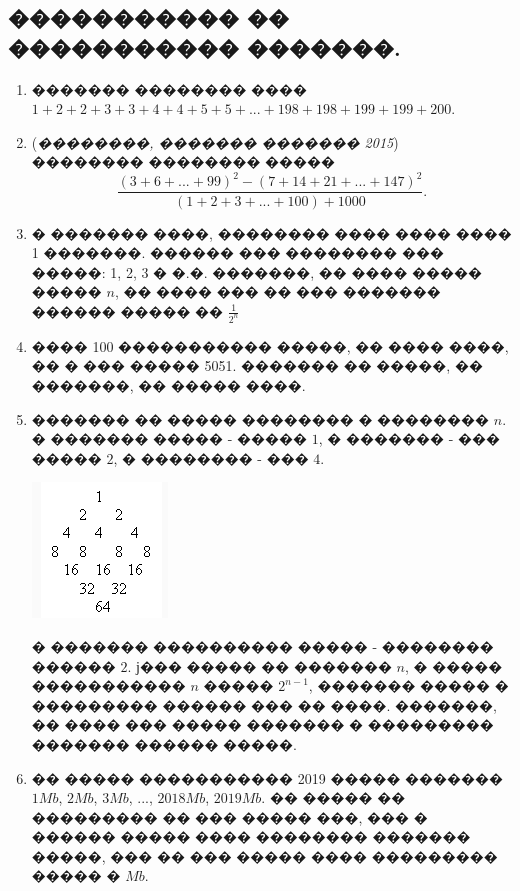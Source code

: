 \documentclass[a4paper,12pt]{article}
\begin{document}
\newpage

\begin{center}
\section*{����������� �� ����������� �������.}
\end{center}

\medskip\medskip\medskip

\begin{enumerate}
\item ������� �������� ���� $1+2+2+3+3+4+4+5+5+...+198+198+199+199+200$.

\item (\textit{��������, ������� ������� 2015})  �������� �������� ����� $$\frac{(3+6+...+99)^{2}-(7+14+21+...+147)^{2}}{(1+2+3+...+100)+1000}.$$

\item � ������� ����, �������� ���� ���� ���� 1 �������. ������ ��� �������� ��� �����: 1, 2, 3 � �.�. �������, �� ���� ����� ����� $n$, �� ���� ��� �� ��� ������� ������ ����� �� ${\frac{1}{2^n}}$

\item ���� 100 ����������� �����, �� ���� ����, �� � ��� ����� 5051. ������� �� �����, �� �������, �� ����� ����.


\item ������� �� ����� �������� � �������� $n$. � ������� ����� - ����� $1$, � ������� - ��� ����� $2$, � �������� - ��� $4$.

\includegraphics[scale=0.75]{cap1}

� ������� ���������� ����� - �������� ������ $2$. ϳ��� ����� �� ������� $n$, � ����� ����������� $n$ ����� $2^{n-1}$, ������� ����� � ��������� ������ ��� �� ����. �������, �� ���� ��� ����� ������� � ��������� ������� ������ �����.

\item �� ����� ����������� 2019 ����� ������� $1Mb$, $2Mb$, $3Mb$, ..., $2018Mb$, $2019Mb$. �� ����� �� ��������� �� ��� ����� ���, ��� � ������ ����� ���� �������� ������� �����, ��� �� ��� ����� ���� ��������� ����� � $Mb$.


\end{enumerate}
\end{document}
